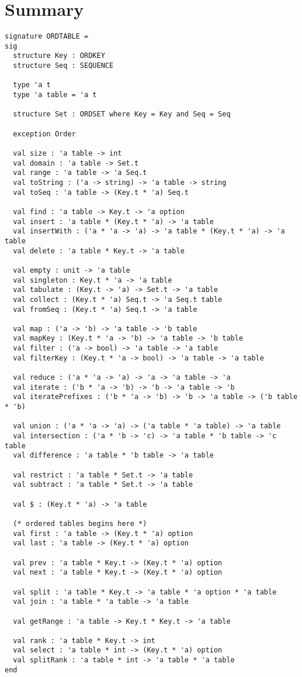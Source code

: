 \section{Summary}
\begin{gram}
\begin{verbatim}
signature ORDTABLE =
sig
  structure Key : ORDKEY
  structure Seq : SEQUENCE

  type 'a t
  type 'a table = 'a t

  structure Set : ORDSET where Key = Key and Seq = Seq

  exception Order

  val size : 'a table -> int
  val domain : 'a table -> Set.t
  val range : 'a table -> 'a Seq.t
  val toString : ('a -> string) -> 'a table -> string
  val toSeq : 'a table -> (Key.t * 'a) Seq.t

  val find : 'a table -> Key.t -> 'a option
  val insert : 'a table * (Key.t * 'a) -> 'a table
  val insertWith : ('a * 'a -> 'a) -> 'a table * (Key.t * 'a) -> 'a table
  val delete : 'a table * Key.t -> 'a table

  val empty : unit -> 'a table
  val singleton : Key.t * 'a -> 'a table
  val tabulate : (Key.t -> 'a) -> Set.t -> 'a table
  val collect : (Key.t * 'a) Seq.t -> 'a Seq.t table
  val fromSeq : (Key.t * 'a) Seq.t -> 'a table

  val map : ('a -> 'b) -> 'a table -> 'b table
  val mapKey : (Key.t * 'a -> 'b) -> 'a table -> 'b table
  val filter : ('a -> bool) -> 'a table -> 'a table
  val filterKey : (Key.t * 'a -> bool) -> 'a table -> 'a table

  val reduce : ('a * 'a -> 'a) -> 'a -> 'a table -> 'a
  val iterate : ('b * 'a -> 'b) -> 'b -> 'a table -> 'b
  val iteratePrefixes : ('b * 'a -> 'b) -> 'b -> 'a table -> ('b table * 'b)

  val union : ('a * 'a -> 'a) -> ('a table * 'a table) -> 'a table
  val intersection : ('a * 'b -> 'c) -> 'a table * 'b table -> 'c table
  val difference : 'a table * 'b table -> 'a table

  val restrict : 'a table * Set.t -> 'a table
  val subtract : 'a table * Set.t -> 'a table

  val $ : (Key.t * 'a) -> 'a table

  (* ordered tables begins here *)
  val first : 'a table -> (Key.t * 'a) option
  val last : 'a table -> (Key.t * 'a) option

  val prev : 'a table * Key.t -> (Key.t * 'a) option
  val next : 'a table * Key.t -> (Key.t * 'a) option

  val split : 'a table * Key.t -> 'a table * 'a option * 'a table
  val join : 'a table * 'a table -> 'a table

  val getRange : 'a table -> Key.t * Key.t -> 'a table

  val rank : 'a table * Key.t -> int
  val select : 'a table * int -> (Key.t * 'a) option
  val splitRank : 'a table * int -> 'a table * 'a table
end
\end{verbatim}
\end{gram}

